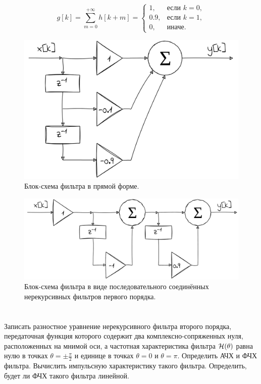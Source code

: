 \begin{equation*}
	g[k] = \sum \limits_{m = 0}^{+\infty} h[k + m] = 
	\begin{cases}
		1, & \text{если } k = 0,\\
		0.9, & \text{если } k = 1,\\
		0, & \text{иначе}.
	\end{cases}
\end{equation*}


\begin{figure}[!h]
	\centering
	\includegraphics[width=0.75\columnwidth]{pics/fall/12/12-2-2.png}
	\caption{Блок-схема фильтра в прямой форме.}
	\label{fig:12-2-2}
\end{figure}

\begin{figure}[!h]
	\centering
	\includegraphics[width=0.75\columnwidth]{pics/fall/12/12-2-3.png}
	\caption{Блок-схема фильтра в виде последовательного соединённых нерекурсивных фильтров первого порядка.}
	\label{fig:12-2-3}
\end{figure}






\section{}
Записать разностное уравнение нерекурсивного фильтра второго порядка, передаточная функция которого содержит два комплексно-сопряженных нуля, расположенных на мнимой оси, а частотная характеристика фильтра $\mathcal{H}(\theta)$ равна нулю в точках $\theta = \pm \frac{\pi}{2}$ и единице в точках $\theta = 0$ и $\theta = \pi$. Определить АЧХ и ФЧХ фильтра. Вычислить импульсную характеристику такого фильтра. Определить, будет ли ФЧХ такого фильтра линейной.

